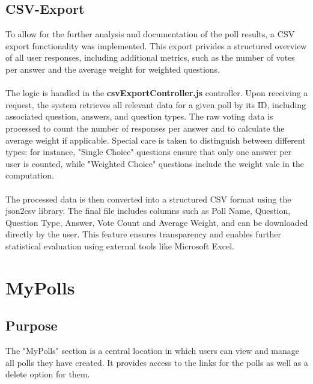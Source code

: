 \documentclass[a4paper,12pt]{report}
\begin{document}
\subsection{CSV-Export}
To allow for the further analysis and documentation of the poll results, a CSV export functionality was implemented. This export privides a structured overview of all user responses, including additional metrics, such as the number of votes per answer and the average weight for weighted questions.\\ \\
The logic is handled in the \textbf{csvExportController.js} controller. Upon receiving a request, the system retrieves all relevant data for a given poll by its ID, including associated question, answers, and question types. The raw voting data is processed to count the number of responses per answer and to calculate the average weight if applicable. Special care is taken to distinguish between different types: for instance, "Single Choice" questions ensure that only one answer per user is counted, while "Weighted Choice" questions include the weight vale in the computation.\\ \\
The processed data is then converted into a structured CSV format using the json2csv library. The final file includes columns such as Poll Name, Question, Question Type, Answer, Vote Count and Average Weight, and can be downloaded directly by the user. This feature ensures transparency and enables further statistical evaluation using external tools like Microsoft Excel.\parencite{json2csv}

\section{MyPolls}
\subsection{Purpose}
The "MyPolls" section is a central location in which users can view and manage all polls they have created. It provides access to the links for the polls as well as a delete option for them.
\end{document}
